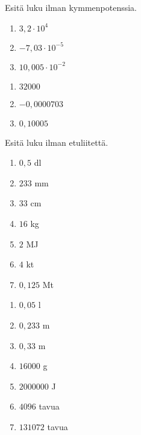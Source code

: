 \begin{tehtava}
Esitä luku ilman kymmenpotenssia.
\begin{enumerate}
\item $3,2 \cdot 10^4$
\item $-7,03 \cdot 10^{-5}$
\item $10,005 \cdot 10^{-2}$
\end{enumerate}
\begin{vastaus}
\begin{enumerate}
\item $32000$
\item $-0,0000703$
\item $0,10005$
\end{enumerate}
\end{vastaus}
\end{tehtava}

\begin{tehtava}
Esitä luku ilman etuliitettä.
\begin{enumerate}
\item $0,5$ dl
\item $233$ mm
\item $33$ cm
\item $16$ kg
\item $2$ MJ
\item $4$ kt
\item $0,125$ Mt
\end{enumerate}
\begin{vastaus}
\begin{enumerate}
\item $0,05$ l
\item $0,233$ m
\item $0,33$ m
\item $16 000$ g
\item $2 000 000$ J
\item $4096$ tavua
\item $131072$ tavua
\end{enumerate}
\end{vastaus}
\end{tehtava}

